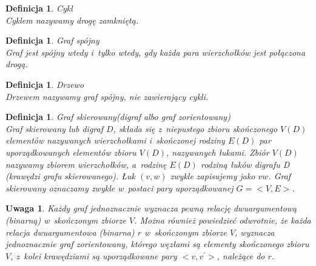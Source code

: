 \documentclass[12pt,a4paper]{report}
\newtheorem{definition}[theorem]{Definicja}
\newtheorem{uwaga}{Uwaga}
\begin{document}
\begin{definition}{Cykl \cite[Rozdział 3]{wilson2008}}\\
Cyklem nazywamy drogę zamkniętą.
\end{definition}


\begin{definition}{Graf spójny \cite[Rozdział 3]{wilson2008}}\\
Graf jest spójny wtedy i~tylko wtedy, gdy każda para wierzchołków jest połączona drogą.
\end{definition}


\begin{definition}{Drzewo \cite[Rozdział 4]{wilson2008}}\\
Drzewem nazywamy graf spójny, nie zawierający cykli.
\end{definition}

\begin{definition}{Graf skierowany(digraf albo graf zorientowany) \cite[Rozdział 7]{wilson2008}}\\
Graf skierowany lub digraf $D$, składa się z~niepustego zbioru skończonego $V(D)$ elementów nazywanych wierzchołkami i~skończonej rodziny $E(D)$ par uporządkowanych elementów zbioru $V(D)$, nazywanych łukami. Zbiór $V(D)$ nazywamy zbiorem wierzchołków, a~rodzinę $E(D)$ rodziną łuków digrafu D (krawędzi grafu skierowanego). Łuk $(v,w)$ zwykle zapisujemy jako $vw$. Graf skierowany oznaczamy zwykle w~postaci pary uporządkowanej $G=<V,E>$.
\end{definition}

\begin{uwaga}
Każdy graf jednoznacznie wyznacza pewną relację dwuargumentową (binarną) w~skończonym zbiorze $V$. Można również powiedzieć odwrotnie, że każda relacja dwuargumentowa (binarna) $r$ w~skończonym zbiorze $V$, wyznacza jednoznacznie graf zorientowany, którego węzłami są elementy skończonego zbioru $V$, z~kolei krawędziami są uporządkowane pary $<v,v^{'}>$, należące do $r$. 
\end{uwaga}
\end{document}
